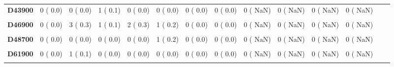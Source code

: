 \documentclass[
]{article}
\begin{document}
\begin{table}[H]
\begin{tabular}[t]{>{\raggedright\arraybackslash}p{5em}ccccccccccccc}
\textbf{D43900} & 0 (  0.0) & 0 (  0.0) & 1 (  0.1) & 0 (  0.0) & 0 (  0.0) & 0 (  0.0) & 0 (  0.0) & 0 (  NaN) & 0 (  NaN) & 0 (  NaN) & 0 (  NaN) &  & \\
\textbf{\cellcolor{gray!10}{D45000}} & \cellcolor{gray!10}{0 (  0.0)} & \cellcolor{gray!10}{0 (  0.0)} & \cellcolor{gray!10}{0 (  0.0)} & \cellcolor{gray!10}{1 (  0.1)} & \cellcolor{gray!10}{0 (  0.0)} & \cellcolor{gray!10}{0 (  0.0)} & \cellcolor{gray!10}{0 (  0.0)} & \cellcolor{gray!10}{0 (  NaN)} & \cellcolor{gray!10}{0 (  NaN)} & \cellcolor{gray!10}{0 (  NaN)} & \cellcolor{gray!10}{0 (  NaN)} & \cellcolor{gray!10}{} & \cellcolor{gray!10}{}\\
\textbf{D46900} & 0 (  0.0) & 3 (  0.3) & 1 (  0.1) & 2 (  0.3) & 1 (  0.2) & 0 (  0.0) & 0 (  0.0) & 0 (  NaN) & 0 (  NaN) & 0 (  NaN) & 0 (  NaN) &  & \\
\textbf{\cellcolor{gray!10}{D47100}} & \cellcolor{gray!10}{2 (  0.2)} & \cellcolor{gray!10}{1 (  0.1)} & \cellcolor{gray!10}{1 (  0.1)} & \cellcolor{gray!10}{0 (  0.0)} & \cellcolor{gray!10}{1 (  0.2)} & \cellcolor{gray!10}{0 (  0.0)} & \cellcolor{gray!10}{0 (  0.0)} & \cellcolor{gray!10}{0 (  NaN)} & \cellcolor{gray!10}{0 (  NaN)} & \cellcolor{gray!10}{0 (  NaN)} & \cellcolor{gray!10}{0 (  NaN)} & \cellcolor{gray!10}{} & \cellcolor{gray!10}{}\\
\textbf{D48700} & 0 (  0.0) & 0 (  0.0) & 0 (  0.0) & 0 (  0.0) & 1 (  0.2) & 0 (  0.0) & 0 (  0.0) & 0 (  NaN) & 0 (  NaN) & 0 (  NaN) & 0 (  NaN) &  & \\
\textbf{\cellcolor{gray!10}{D59100}} & \cellcolor{gray!10}{0 (  0.0)} & \cellcolor{gray!10}{0 (  0.0)} & \cellcolor{gray!10}{0 (  0.0)} & \cellcolor{gray!10}{0 (  0.0)} & \cellcolor{gray!10}{0 (  0.0)} & \cellcolor{gray!10}{1 (  0.4)} & \cellcolor{gray!10}{0 (  0.0)} & \cellcolor{gray!10}{0 (  NaN)} & \cellcolor{gray!10}{0 (  NaN)} & \cellcolor{gray!10}{0 (  NaN)} & \cellcolor{gray!10}{0 (  NaN)} & \cellcolor{gray!10}{} & \cellcolor{gray!10}{}\\
\textbf{D61900} & 0 (  0.0) & 1 (  0.1) & 0 (  0.0) & 0 (  0.0) & 0 (  0.0) & 0 (  0.0) & 0 (  0.0) & 0 (  NaN) & 0 (  NaN) & 0 (  NaN) & 0 (  NaN) &  & \\
\textbf{\cellcolor{gray!10}{D64900}} & \cellcolor{gray!10}{1 (  0.1)} & \cellcolor{gray!10}{1 (  0.1)} & \cellcolor{gray!10}{3 (  0.3)} & \cellcolor{gray!10}{1 (  0.1)} & \cellcolor{gray!10}{1 (  0.2)} & \cellcolor{gray!10}{2 (  0.7)} & \cellcolor{gray!10}{1 (  0.4)} & \cellcolor{gray!10}{0 (  NaN)} & \cellcolor{gray!10}{0 (  NaN)} & \cellcolor{gray!10}{0 (  NaN)} & \cellcolor{gray!10}{0 (  NaN)} & \cellcolor{gray!10}{} & \cellcolor{gray!10}{}\\

\end{tabular}
\end{table}
\end{document}
